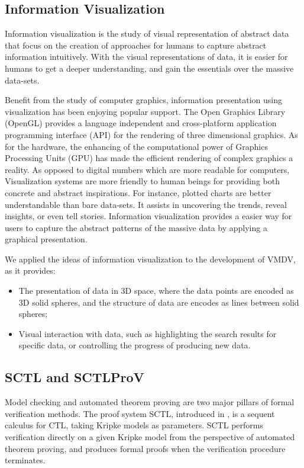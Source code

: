 \documentclass[runningheads]{llncs}
\begin{document}
\subsection{Information Visualization}
Information visualization is the study of visual representation of abstract data that focus on the creation of approaches for humans to capture abstract information intuitively. With the visual representations of data, it is easier for humans to get a deeper understanding, and gain the essentials over the massive data-sets.
 
Benefit from the study of computer graphics, information presentation using visualization has been enjoying popular support.  The Open Graphics Library (\textsf{OpenGL}) provides a language independent and cross-platform application programming interface (\textsf{API}) for the rendering of three dimensional graphics. As for the hardware, the enhancing of the computational power of Graphics Processing Units (\textsf{GPU}) has made the efficient rendering of complex graphics a reality. As opposed to digital numbers which are more readable for computers, Visualization systems are more friendly to human beings for providing both concrete and abstract inspirations. For instance, plotted charts are better understandable than bare data-sets. It assists in uncovering the trends, reveal insights, or even tell stories. Information visualization provides a easier way for users to capture the abstract patterns of the massive data by applying a graphical presentation.
 
We applied the ideas of information visualization to the development of \textsf{VMDV}, as it provides:
\begin{itemize}
       \item The presentation of data in 3D space, where the data points are encoded as 3D solid spheres, and the structure of data are encodes as lines between solid spheres;
       \item Visual interaction with data, such as highlighting the search results for specific data, or controlling the progress of producing new data.
\end{itemize}
 
\subsection{\textsf{SCTL} and \textsf{SCTLProV}}
Model checking \cite{CGP01,EmersonC82,EmersonH85} and automated theorem proving
\cite{Fitting96,Loveland78} are two major pillars of formal verification methods.
The proof system \textsf{SCTL}, introduced in \cite{dowek2013logical}, is a sequent calculus for \textsf{CTL},
taking Kripke models as parameters.
\textsf{SCTL} performs verification directly on a given Kripke model from the perspective of automated theorem proving,
and produces formal proofs when the verification procedure terminates.
 
\end{document}
